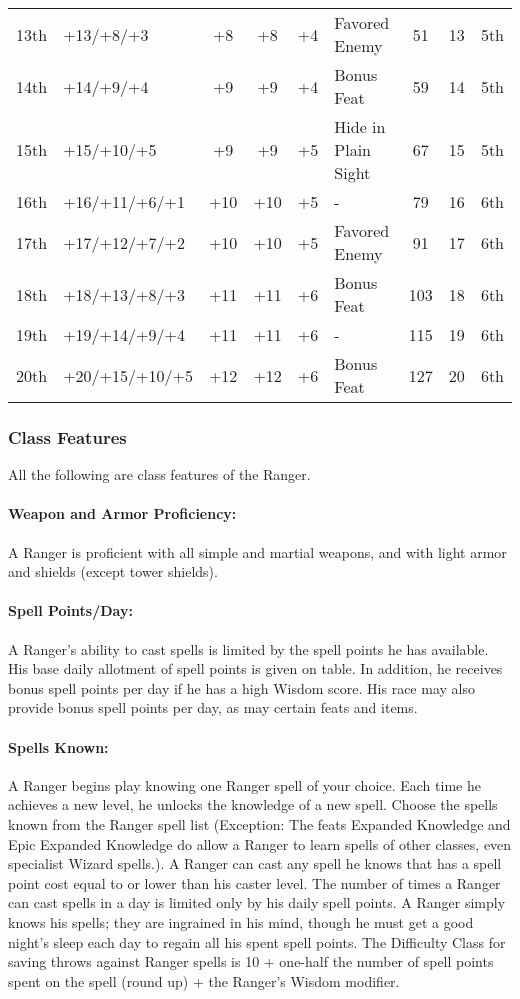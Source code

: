 \begin{table*}
{\begin{tabular}{|l|l|c|c|c|l|c|c|c|}
13th &+13/+8/+3 	&+8 &+8 &+4 	&Favored Enemy				&51 &13 &5th\\
14th &+14/+9/+4 	&+9 &+9 &+4 	&Bonus Feat				&59 &14 &5th\\
15th &+15/+10/+5	&+9 &+9 &+5 	&Hide in Plain Sight			&67 &15 &5th\\
16th &+16/+11/+6/+1 	&+10 &+10 &+5 	&-					&79 &16 &6th\\
17th &+17/+12/+7/+2 	&+10 &+10 &+5 	&Favored Enemy				&91 &17 &6th\\
18th &+18/+13/+8/+3 	&+11 &+11 &+6 	&Bonus Feat				&103 &18 &6th\\
19th &+19/+14/+9/+4 	&+11 &+11 &+6 	&-					&115 &19 &6th\\
20th &+20/+15/+10/+5	&+12 &+12 &+6 	&Bonus Feat				&127 &20 &6th\\
\hline
\end{tabular}}
\end{table*}
\subsubsection{Class Features}
All the following are class features of the Ranger.

\paragraph{Weapon and Armor Proficiency:} 
A Ranger is proficient with all simple and martial weapons, and with light armor and shields (except tower shields).

\paragraph{Spell Points/Day:} A Ranger's ability to cast spells is limited by the spell points he has available. 
His base daily allotment of spell points is given on  table. 
In addition, he receives bonus spell points per day if he has a high Wisdom score.
His race may also provide bonus spell points per day, as may certain feats and items.

\paragraph{Spells Known:} A Ranger begins play knowing one Ranger spell of your choice. 
Each time he achieves a new level, he unlocks the knowledge of a new spell.
Choose the spells known from the Ranger spell list
(Exception: The feats Expanded Knowledge and Epic Expanded Knowledge do allow a Ranger to learn spells of other classes, even specialist Wizard spells.).
A Ranger can cast any spell he knows that has a spell point cost equal to or lower than his caster level.
The number of times a Ranger can cast spells in a day is limited only by his daily spell points. 
A Ranger simply knows his spells; they are ingrained in his mind, though he must get a good night's sleep each day to regain all his spent spell points.
The Difficulty Class for saving throws against Ranger spells is 10 + one-half the number of spell points spent on the spell (round up) + the Ranger's Wisdom modifier. 

